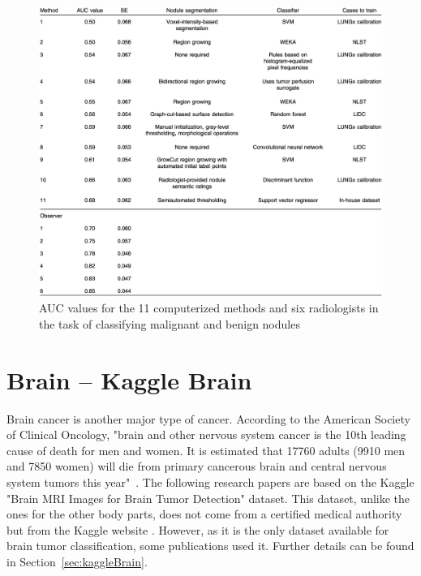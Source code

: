 \begin{figure}[!h]
\centering
\includegraphics[width=1\textwidth, keepaspectratio=true]{./figures/LUNGx_challenge_all_results.png}
\caption{AUC values for the 11 computerized methods and six radiologists in the task of classifying malignant and benign nodules~\cite{12}}
\label{fig:LUNGx_challenge_all_results}
\end{figure}



\section{Brain -- Kaggle Brain}

\setlength{\marginparwidth}{3cm}\leavevmode {}Brain cancer is another major type of cancer. According to the American Society of Clinical Oncology, "brain and other nervous system cancer is the 10th leading cause of death for men and women. It is estimated that 17760 adults (9910 men and 7850 women) will die from primary cancerous brain and central nervous system tumors this year"~\cite{43}. The following research papers are based on the Kaggle "Brain MRI Images for Brain Tumor Detection" dataset. This dataset, unlike the ones for the other body parts, does not come from a certified medical authority but from the Kaggle website \cite{45}. However, as it is the only dataset available for brain tumor classification, some publications used it. Further details can be found in \mbox{Section \ref{sec:kaggleBrain}}.

